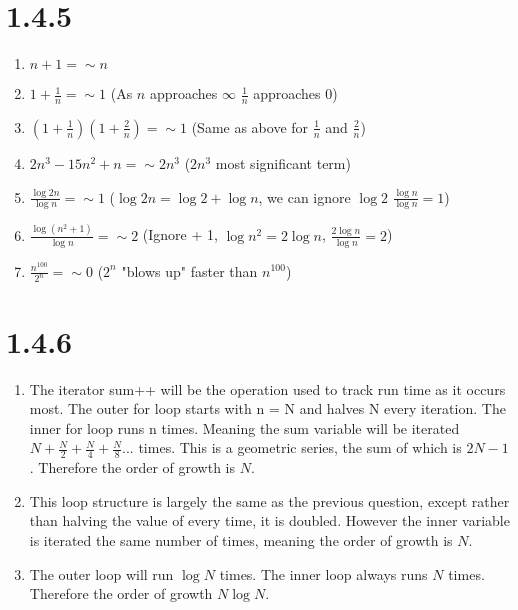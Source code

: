 \documentclass[12pt]{article}
\begin{document}
\newpage
\noindent 



\section*{1.4.5}

\begin{enumerate}[label=(\alph*)]

  \item $n + 1 = \sim  n$
  \item $1 + \frac{1}{n} = \sim 1$ (As $n$ approaches $\infty$ $\frac{1}{n}$
  approaches $0$)
  \item $(1 + \frac{1}{n})(1 + \frac{2}{n}) = \sim 1$ (Same as above for
  $\frac{1}{n}$ and $\frac{2}{n}$)
  \item $2n^3 - 15n^2 + n  = \sim 2n^3$ ($2n^3$ most significant term)
  \item $\frac{\log 2n}{\log n} = \sim 1$ ($\log{2n} = \log 2 + \log n$,
  we can ignore $\log 2$ $\frac{\log n}{\log n} = 1$)
  \item $\frac{\log (n^2 + 1)}{\log n} = \sim 2$ (Ignore + 1, $\log n^2 = 2\log n$,
  $\frac{2 \log n}{\log n} = 2$)
  \item $\frac{n^{100}}{2^n} = \sim 0$ ($2^n$ "blows up" faster than $n^{100}$)

\end{enumerate}

\section*{1.4.6}

\begin{enumerate}[label = (\alph*)]
  \item The iterator sum++ will be the operation used to track run time
  as it occurs most. The outer for loop starts with n = N and halves N every
  iteration. The inner for loop runs n times. Meaning the sum variable will be
  iterated $N + \frac{N}{2} + \frac{N}{4} + \frac{N}{8} ...$ times. This is a
  geometric series, the sum of which is $2N-1$. Therefore the order of growth
  is $N$. 
  \item This loop structure is largely the same as the previous question, except
  rather than halving the value of every time, it is doubled. However the inner
  variable is iterated the same number of times, meaning the order of growth is $N$.
  \item The outer loop will run $\log N$ times. The inner loop always runs
  $N$ times. Therefore the order of growth $N\log{N}$.

\end{enumerate}
\end{document}
